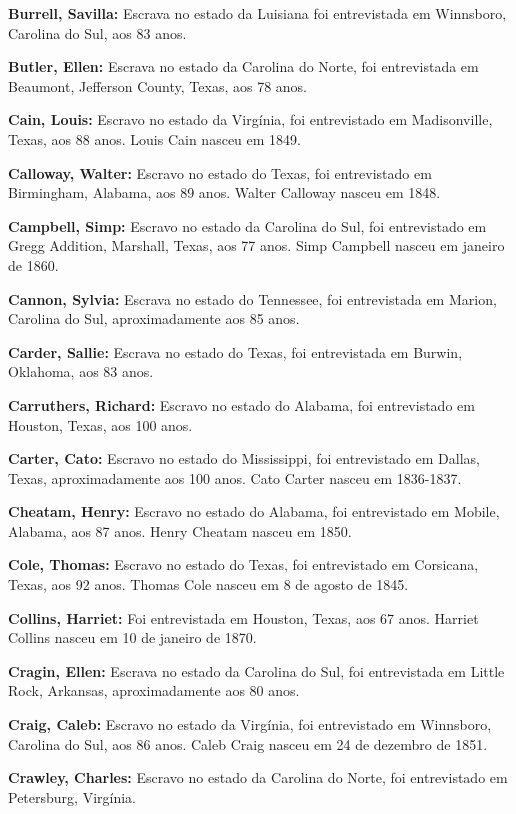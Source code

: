 \textbf{Burrell, Savilla:} Escrava no estado da Luisiana foi
entrevistada em Winnsboro, Carolina do Sul, aos 83 anos.

\textbf{Butler, Ellen:} Escrava no estado da Carolina do Norte, foi
entrevistada em Beaumont, Jefferson County, Texas, aos 78 anos.

\textbf{Cain, Louis:} Escravo no estado da Virgínia, foi entrevistado em
Madisonville, Texas, aos 88 anos. Louis Cain nasceu em 1849.

\textbf{Calloway, Walter:} Escravo no estado do Texas, foi entrevistado
em Birmingham, Alabama, aos 89 anos. Walter Calloway nasceu em 1848.

\textbf{Campbell, Simp:} Escravo no estado da Carolina do Sul, foi
entrevistado em Gregg Addition, Marshall, Texas, aos 77 anos. Simp
Campbell nasceu em janeiro de 1860.

\textbf{Cannon, Sylvia:} Escrava no estado do Tennessee, foi
entrevistada em Marion, Carolina do Sul, aproximadamente aos 85 anos.

\textbf{Carder, Sallie:} Escrava no estado do Texas, foi entrevistada em
Burwin, Oklahoma, aos 83 anos.

\textbf{Carruthers, Richard:} Escravo no estado do Alabama, foi
entrevistado em Houston, Texas, aos 100 anos.

\textbf{Carter, Cato:} Escravo no estado do Mississippi, foi
entrevistado em Dallas, Texas, aproximadamente aos 100 anos. Cato Carter
nasceu em 1836-1837.

\textbf{Cheatam, Henry:} Escravo no estado do Alabama, foi entrevistado
em Mobile, Alabama, aos 87 anos. Henry Cheatam nasceu em 1850.

\textbf{Cole, Thomas:} Escravo no estado do Texas, foi entrevistado em
Corsicana, Texas, aos 92 anos. Thomas Cole nasceu em 8 de agosto de
1845.

\textbf{Collins, Harriet:} Foi entrevistada em Houston, Texas, aos 67
anos. Harriet Collins nasceu em 10 de janeiro de 1870.

\textbf{Cragin, Ellen:} Escrava no estado da Carolina do Sul, foi
entrevistada em Little Rock, Arkansas, aproximadamente aos 80 anos.

\textbf{Craig, Caleb:} Escravo no estado da Virgínia, foi entrevistado
em Winnsboro, Carolina do Sul, aos 86 anos. Caleb Craig nasceu em 24 de
dezembro de 1851.

\textbf{Crawley, Charles:} Escravo no estado da Carolina do Norte, foi
entrevistado em Petersburg, Virgínia.

